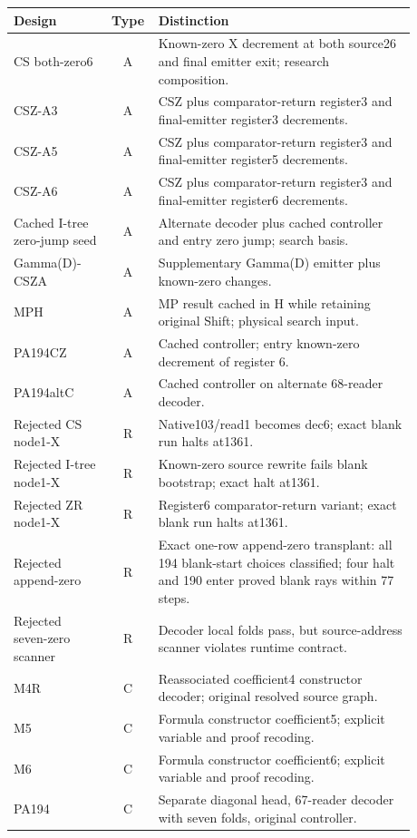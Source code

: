 \small
\begin{longtable}{@{}p{0.24\linewidth}cp{0.64\linewidth}@{}}
\toprule Design & Type & Distinction\\\midrule\endhead
CS both-zero6 & A & Known-zero X decrement at both source26 and final emitter exit; research composition.\\[4pt]
CSZ-A3 & A & CSZ plus comparator-return register3 and final-emitter register3 decrements.\\[4pt]
CSZ-A5 & A & CSZ plus comparator-return register3 and final-emitter register5 decrements.\\[4pt]
CSZ-A6 & A & CSZ plus comparator-return register3 and final-emitter register6 decrements.\\[4pt]
Cached I-tree zero-jump seed & A & Alternate decoder plus cached controller and entry zero jump; search basis.\\[4pt]
Gamma(D)-CSZA & A & Supplementary Gamma(D) emitter plus known-zero changes.\\[4pt]
MPH & A & MP result cached in H while retaining original Shift; physical search input.\\[4pt]
PA194CZ & A & Cached controller; entry known-zero decrement of register 6.\\[4pt]
PA194altC & A & Cached controller on alternate 68-reader decoder.\\[4pt]
Rejected CS node1-X & R & Native103/read1 becomes dec6; exact blank run halts at1361.\\[4pt]
Rejected I-tree node1-X & R & Known-zero source rewrite fails blank bootstrap; exact halt at1361.\\[4pt]
Rejected ZR node1-X & R & Register6 comparator-return variant; exact blank run halts at1361.\\[4pt]
Rejected append-zero & R & Exact one-row append-zero transplant: all 194 blank-start choices classified; four halt and 190 enter proved blank rays within 77 steps.\\[4pt]
Rejected seven-zero scanner & R & Decoder local folds pass, but source-address scanner violates runtime contract.\\[4pt]
M4R & C & Reassociated coefficient4 constructor decoder; original resolved source graph.\\[4pt]
M5 & C & Formula constructor coefficient5; explicit variable and proof recoding.\\[4pt]
M6 & C & Formula constructor coefficient6; explicit variable and proof recoding.\\[4pt]
PA194 & C & Separate diagonal head, 67-reader decoder with seven folds, original controller.\\[4pt]

\end{longtable}
